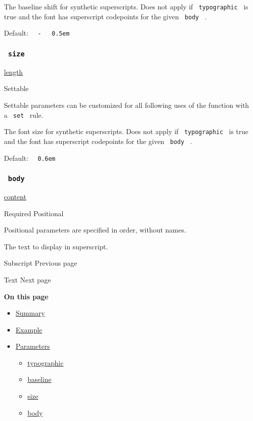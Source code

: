 The baseline shift for synthetic superscripts. Does not apply if
\texttt{\ typographic\ } is true and the font has superscript codepoints
for the given \texttt{\ body\ } .

Default:
\texttt{\ }{\texttt{\ -\ }}\texttt{\ }{\texttt{\ 0.5em\ }}\texttt{\ }

\subsubsection{\texorpdfstring{\texttt{\ size\ }}{ size }}\label{parameters-size}

\href{/docs/reference/layout/length/}{length}

{{ Settable }}

\label{parameters-size-settable-tooltip}
Settable parameters can be customized for all following uses of the
function with a \texttt{\ set\ } rule.

The font size for synthetic superscripts. Does not apply if
\texttt{\ typographic\ } is true and the font has superscript codepoints
for the given \texttt{\ body\ } .

Default: \texttt{\ }{\texttt{\ 0.6em\ }}\texttt{\ }

\subsubsection{\texorpdfstring{\texttt{\ body\ }}{ body }}\label{parameters-body}

\href{/docs/reference/foundations/content/}{content}

{Required} {{ Positional }}

\label{parameters-body-positional-tooltip}
Positional parameters are specified in order, without names.

The text to display in superscript.

\href{/docs/reference/text/sub/}{\pandocbounded{}}

{ Subscript } { Previous page }

\href{/docs/reference/text/text/}{\pandocbounded{}}

{ Text } { Next page }

\textbf{On this page}

\begin{itemize}
\tightlist
\item
  \hyperref[summary]{Summary}
\item
  \hyperref[example]{Example}
\item
  \hyperref[parameters]{Parameters}

  \begin{itemize}
  \tightlist
  \item
    \hyperref[parameters-typographic]{typographic}
  \item
    \hyperref[parameters-baseline]{baseline}
  \item
    \hyperref[parameters-size]{size}
  \item
    \hyperref[parameters-body]{body}
  \end{itemize}
\end{itemize}


